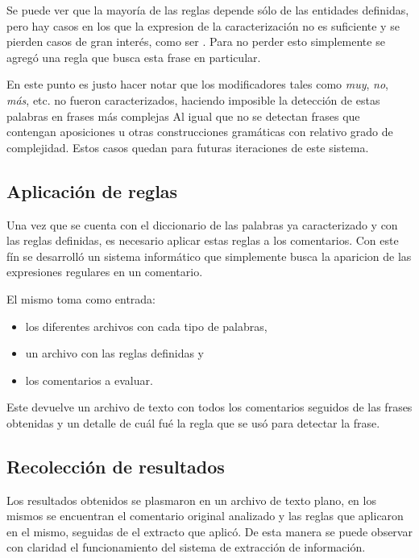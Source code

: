 Se puede ver que la mayoría de las reglas depende sólo de las entidades definidas, pero hay casos en los que la expresion de la caracterización no es suficiente y se pierden casos de gran interés, como ser . Para no perder esto simplemente se agregó una regla que busca esta frase en particular.

En este punto es justo hacer notar que los modificadores tales como \emph{muy}, \emph{no}, \emph{más}, etc. no fueron caracterizados, haciendo imposible la detección de estas palabras en frases más complejas  Al igual que no se detectan frases que contengan aposiciones u otras construcciones gramáticas con relativo grado de complejidad. Estos casos quedan para futuras iteraciones de este sistema.

\subsection{Aplicación de reglas}

Una vez que se cuenta con el diccionario de las palabras ya caracterizado y con las reglas definidas, es necesario aplicar estas reglas a los comentarios. Con este fín se desarrolló un sistema informático que simplemente busca la aparicion de las expresiones regulares en un comentario.

El mismo toma como entrada:
\begin{itemize}
\item los diferentes archivos con cada tipo de palabras,
\item un archivo con las reglas definidas y
\item los comentarios a evaluar.
\end{itemize}

Este devuelve un archivo de texto con todos los comentarios seguidos de las frases obtenidas y un detalle de cuál fué la regla que se usó para detectar la frase.

\subsection{Recolección de resultados}

Los resultados obtenidos se plasmaron en un archivo de texto plano, en los mismos se encuentran el comentario original analizado y las reglas que aplicaron en el mismo, seguidas de el extracto que aplicó.
De esta manera se puede observar con claridad el funcionamiento del sistema de extracción de información.

